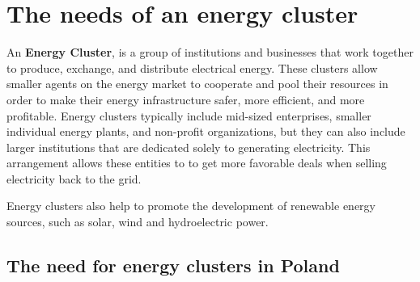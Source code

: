 \chapter{The needs of an energy cluster}
\label{ch:background}

\par An \textbf{Energy Cluster}, is a group of institutions and businesses that work together to produce, exchange, and distribute electrical energy. These clusters allow smaller agents on the energy market to cooperate and pool their resources in order to make their energy infrastructure safer, more efficient, and more profitable. Energy clusters typically include mid-sized enterprises, smaller individual energy plants, and non-profit organizations, but they can also include larger institutions that are dedicated solely to generating electricity. This arrangement allows these entities to to get more favorable deals when selling electricity back to the grid. 
\par Energy clusters also help to promote the development of renewable energy sources, such as solar, wind and hydroelectric power\citep{Uwarunkowania1}\citep{Uwarunkowania2}\citep{WoznyMasters}.
\section{The need for energy clusters in Poland}

